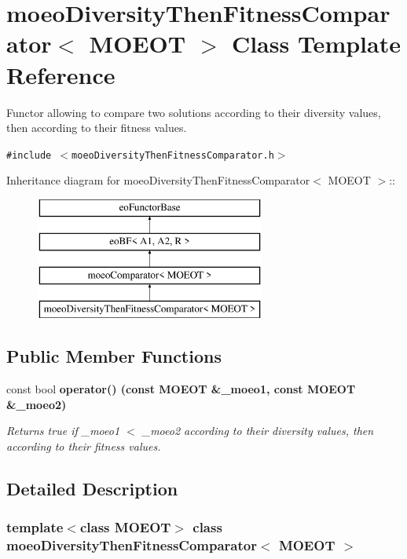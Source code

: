 \section{moeo\-Diversity\-Then\-Fitness\-Comparator$<$ MOEOT $>$ Class Template Reference}
\label{classmoeoDiversityThenFitnessComparator}
Functor allowing to compare two solutions according to their diversity values, then according to their fitness values.  


{\tt \#include $<$moeo\-Diversity\-Then\-Fitness\-Comparator.h$>$}

Inheritance diagram for moeo\-Diversity\-Then\-Fitness\-Comparator$<$ MOEOT $>$::\begin{figure}[H]
\begin{center}
\leavevmode
\includegraphics[height=4cm]{classmoeoDiversityThenFitnessComparator}
\end{center}
\end{figure}
\subsection*{Public Member Functions}
\begin{CompactItemize}
\item 
const bool \bf{operator()} (const MOEOT \&\_\-moeo1, const MOEOT \&\_\-moeo2)
\begin{CompactList}\small\item\em Returns true if \_\-moeo1 $<$ \_\-moeo2 according to their diversity values, then according to their fitness values. \item\end{CompactList}\end{CompactItemize}


\subsection{Detailed Description}
\subsubsection*{template$<$class MOEOT$>$ class moeo\-Diversity\-Then\-Fitness\-Comparator$<$ MOEOT $>$}

